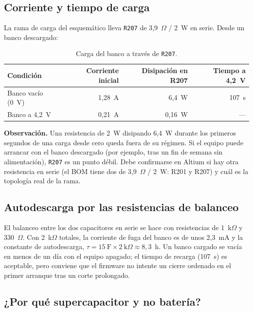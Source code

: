 \documentclass[11pt,a4paper]{article}
\begin{document}
\subsection{Corriente y tiempo de carga}

La rama de carga del esquemático lleva \texttt{R207} de 3,9~$\Omega$ / 2~W en
serie. Desde un banco descargado:

\begin{table}[H]
\centering
\caption{Carga del banco a través de \texttt{R207}.}
\label{tab:carga}
\small
\begin{tabularx}{\textwidth}{@{}X r r r@{}}
\toprule
\textbf{Condición} & \textbf{Corriente inicial} & \textbf{Disipación en R207} & \textbf{Tiempo a 4,2~V} \\
\midrule
Banco vacío (0~V) & 1,28~A & 6,4~W & 107~s \\
Banco a 4,2~V & 0,21~A & 0,16~W & --- \\
\bottomrule
\end{tabularx}
\end{table}

\noindent \textbf{Observación.} Una resistencia de 2~W disipando 6,4~W durante
los primeros segundos de una carga desde cero queda fuera de su régimen. Si el
equipo puede arrancar con el banco descargado (por ejemplo, tras un fin de
semana sin alimentación), \texttt{R207} es un punto débil. Debe confirmarse en
Altium si hay otra resistencia en serie (el BOM tiene dos de 3,9~$\Omega$ /
2~W: R201 y R207) y cuál es la topología real de la rama.

\subsection{Autodescarga por las resistencias de balanceo}

El balanceo entre los dos capacitores en serie se hace con resistencias de
1~k$\Omega$ y 330~$\Omega$. Con 2~k$\Omega$ totales, la corriente de fuga del
banco es de unos 2,3~mA y la constante de autodescarga,
$\tau = 15~\mathrm{F}\times 2~\mathrm{k}\Omega \approx 8{,}3$~h. Un banco
cargado se vacía en menos de un día con el equipo apagado; el tiempo de recarga
(107~s) es aceptable, pero conviene que el firmware no intente un cierre
ordenado en el primer arranque tras un corte prolongado.

\subsection{¿Por qué supercapacitor y no batería?}
\label{sec:bateria}
\end{document}
